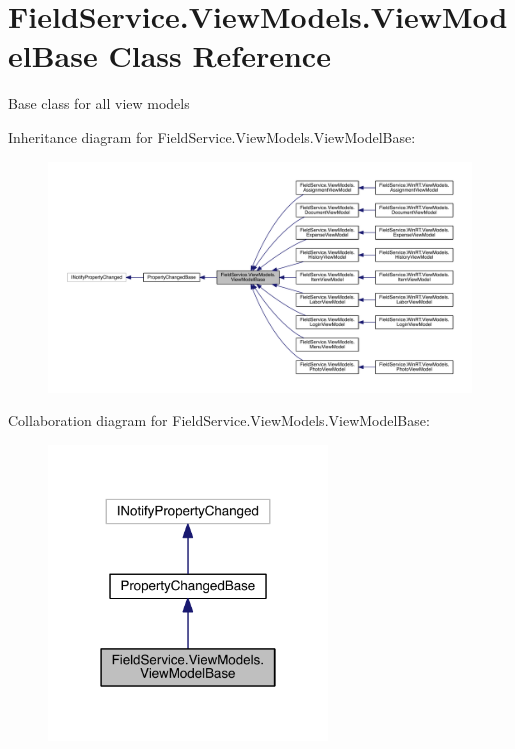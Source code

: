 \hypertarget{class_field_service_1_1_view_models_1_1_view_model_base}{\section{Field\+Service.\+View\+Models.\+View\+Model\+Base Class Reference}
\label{class_field_service_1_1_view_models_1_1_view_model_base}
}


Base class for all view models  




Inheritance diagram for Field\+Service.\+View\+Models.\+View\+Model\+Base\+:
\nopagebreak
\begin{figure}[H]
\begin{center}
\leavevmode
\includegraphics[width=350pt]{class_field_service_1_1_view_models_1_1_view_model_base__inherit__graph}
\end{center}
\end{figure}


Collaboration diagram for Field\+Service.\+View\+Models.\+View\+Model\+Base\+:
\nopagebreak
\begin{figure}[H]
\begin{center}
\leavevmode
\includegraphics[width=210pt]{class_field_service_1_1_view_models_1_1_view_model_base__coll__graph}
\end{center}
\end{figure}
